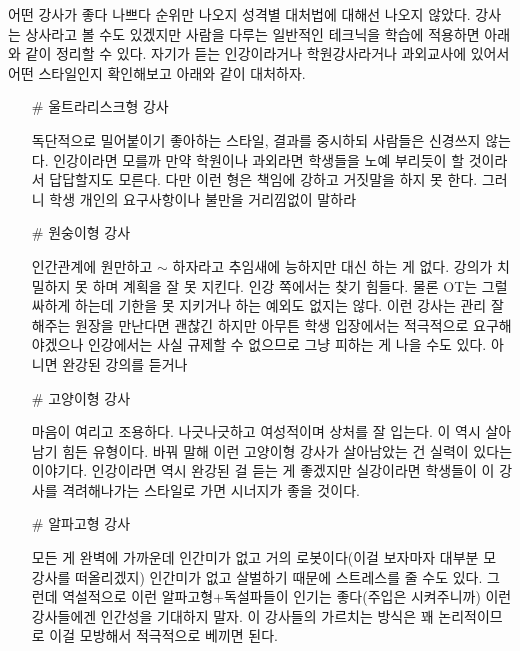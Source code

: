 어떤 강사가 좋다 나쁘다 순위만 나오지 성격별 대처법에 대해선 나오지 않았다.
강사는 상사라고 볼 수도 있겠지만 사람을 다루는 일반적인 테크닉을 학습에 적용하면 아래와 같이 정리할 수 있다.
자기가 듣는 인강이라거나 학원강사라거나 과외교사에 있어서 어떤 스타일인지 확인해보고 아래와 같이 대처하자.
\vspace{5mm}
\begin{itemize}
    

    \item[$\#$] 울트라리스크형 강사
\vspace{5mm}

독단적으로 밀어붙이기 좋아하는 스타일, 결과를 중시하되 사람들은 신경쓰지 않는다.
인강이라면 모를까 만약 학원이나 과외라면 학생들을 노예 부리듯이 할 것이라서 답답할지도 모른다.
다만 이런 형은 책임에 강하고 거짓말을 하지 못 한다. 그러니 학생 개인의 요구사항이나 불만을 거리낌없이 말하라
\vspace{5mm}

\item[$\#$]  원숭이형 강사
\vspace{5mm}

인간관계에 원만하고 $\sim$ 하자라고 추임새에 능하지만 대신 하는 게 없다. 강의가 치밀하지 못 하며 계획을 잘 못 지킨다.
인강 쪽에서는 찾기 힘들다. 물론 OT는 그럴싸하게 하는데 기한을 못 지키거나 하는 예외도 없지는 않다.
이런 강사는 관리 잘 해주는 원장을 만난다면 괜찮긴 하지만 아무튼 학생 입장에서는 적극적으로 요구해야겠으나
인강에서는 사실 규제할 수 없으므로 그냥 피하는 게 나을 수도 있다. 아니면 완강된 강의를 듣거나
\vspace{5mm}

\item[$\#$] 고양이형 강사
\vspace{5mm}

마음이 여리고 조용하다. 나긋나긋하고 여성적이며 상처를 잘 입는다.
이 역시 살아남기 힘든 유형이다. 바꿔 말해 이런 고양이형 강사가 살아남았는 건 실력이 있다는 이야기다.
인강이라면 역시 완강된 걸 듣는 게 좋겠지만 실강이라면 학생들이 이 강사를 격려해나가는 스타일로 가면 시너지가 좋을 것이다.
\vspace{5mm}

\item[$\#$] 알파고형 강사
\vspace{5mm}

모든 게 완벽에 가까운데 인간미가 없고 거의 로봇이다(이걸 보자마자 대부분 모 강사를 떠올리겠지)
인간미가 없고 살벌하기 때문에 스트레스를 줄 수도 있다. 그런데 역설적으로 이런 알파고형+독설파들이 인기는 좋다(주입은 시켜주니까)
이런 강사들에겐 인간성을 기대하지 말자. 이 강사들의 가르치는 방식은 꽤 논리적이므로 이걸 모방해서 적극적으로 베끼면 된다.
\vspace{5mm}


\end{itemize}
